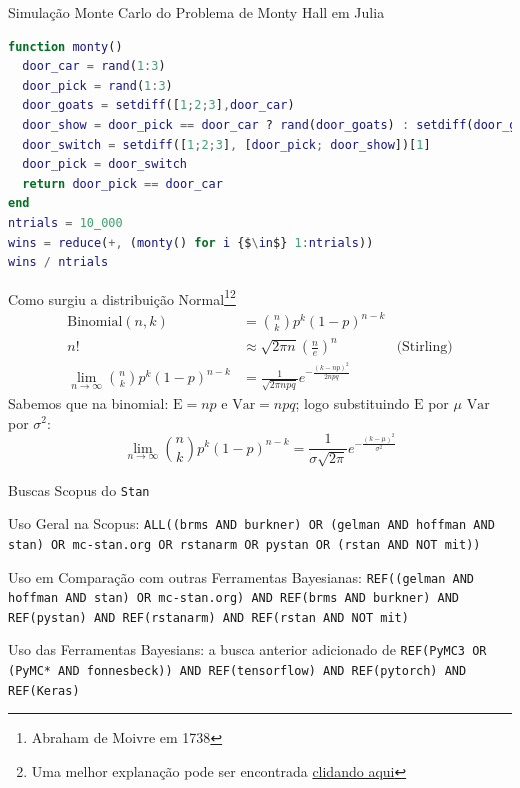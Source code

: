 \documentclass[aspectratio=169]{beamer}                    %
\begin{document}
\begin{frame}{Simulação Monte Carlo do Problema de Monty Hall em Julia}
  \begin{lstlisting}[basicstyle=\footnotesize, language=Matlab,escapeinside=\{\}]
function monty()
  door_car = rand(1:3)
  door_pick = rand(1:3)
  door_goats = setdiff([1;2;3],door_car)
  door_show = door_pick == door_car ? rand(door_goats) : setdiff(door_goats,door_pick)
  door_switch = setdiff([1;2;3], [door_pick; door_show])[1]
  door_pick = door_switch
  return door_pick == door_car
end
ntrials = 10_000
wins = reduce(+, (monty() for i {$\in$} 1:ntrials))
wins / ntrials
    \end{lstlisting}
\end{frame}

\begin{frame}[plain, noframenumbering, label=appendixnormal]{Como surgiu a distribuição Normal\footnote{Abraham de Moivre em 1738}\footnote{Uma melhor explanação pode ser encontrada \href{http://www.stat.yale.edu/~pollard/Courses/241.fall2014/notes2014/Bin.Normal.pdf}{clidando aqui}}}
  $$
  \begin{aligned}
    \text{Binomial}(n, k) &= \binom{n}{k} p^k (1-p)^{n-k} \\
    n! &\approx \sqrt{2 \pi n} \left(\frac{n}{e}\right)^n &\text{(Stirling)} \\
    \lim_{n \to \infty} \binom{n}{k} p^k (1-p)^{n-k} &= \frac{1}{\sqrt{2 \pi npq}} e^{-\frac{(k - np)^2}{2npq}}
  \end{aligned}
  $$
  Sabemos que na binomial: $\mathrm{E} = np$ e $\mathrm{Var} = npq$; logo substituindo $\mathrm{E}$ por $\mu$ $\mathrm{Var}$ por $\sigma^2$:
  $$\lim_{n \to \infty} \binom{n}{k} p^k (1-p)^{n-k} = \frac{1}{\sigma \sqrt{2 \pi}} e^{-\frac{(k - \mu)^2}{\sigma^2}}$$
\end{frame}

\begin{frame}[plain, noframenumbering, label=appendixscopus]{Buscas Scopus do \texttt{Stan}}
  \begin{vfilleditems}
      \item Uso Geral na Scopus: \texttt{ALL((brms AND burkner) OR (gelman AND hoffman AND stan) OR mc-stan.org OR rstanarm OR pystan OR (rstan AND NOT mit))}
      \item Uso em Comparação com outras Ferramentas Bayesianas: \texttt{REF((gelman AND hoffman AND stan) OR mc-stan.org) AND REF(brms AND burkner) AND REF(pystan) AND REF(rstanarm) AND REF(rstan AND NOT mit)}
      \item Uso das Ferramentas Bayesians: a busca anterior adicionado de \texttt{REF(PyMC3 OR (PyMC* AND fonnesbeck)) AND REF(tensorflow) AND REF(pytorch) AND REF(Keras)}
  \end{vfilleditems}
\end{frame}
\end{document}
